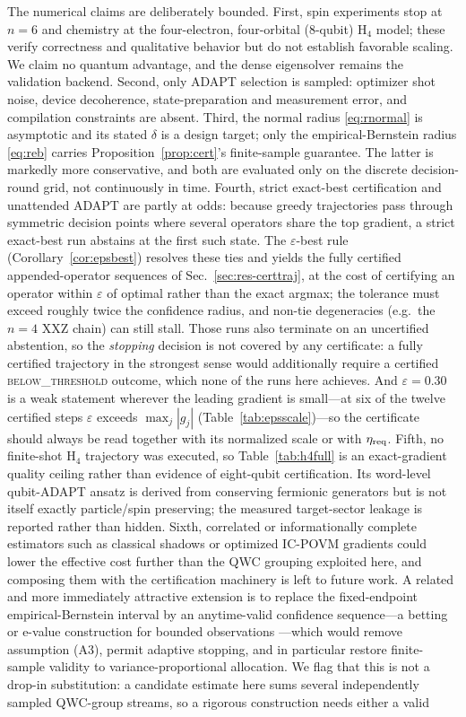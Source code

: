 \documentclass[aps,pra,reprint,superscriptaddress,nofootinbib,floatfix]{revtex4-2}
\begin{document}
The numerical claims are deliberately bounded. First, spin experiments stop at $n=6$ and chemistry at the four-electron, four-orbital ($8$-qubit) H$_4$ model; these verify correctness and qualitative behavior but do not establish favorable scaling. We claim no quantum advantage, and the dense eigensolver remains the validation backend. Second, only ADAPT selection is sampled: optimizer shot noise, device decoherence, state-preparation and measurement error, and compilation constraints are absent. Third, the normal radius \eqref{eq:rnormal} is asymptotic and its stated $\delta$ is a design target; only the empirical-Bernstein radius \eqref{eq:reb} carries Proposition~\ref{prop:cert}'s finite-sample guarantee. The latter is markedly more conservative, and both are evaluated only on the discrete decision-round grid, not continuously in time. Fourth, strict exact-best certification and unattended ADAPT are partly at odds: because greedy trajectories pass through symmetric decision points where several operators share the top gradient, a strict exact-best run abstains at the first such state. The $\varepsilon$-best rule (Corollary~\ref{cor:epsbest}) resolves these ties and yields the fully certified appended-operator sequences of Sec.~\ref{sec:res-certtraj}, at the cost of certifying an operator within $\varepsilon$ of optimal rather than the exact argmax; the tolerance must exceed roughly twice the confidence radius, and non-tie degeneracies (e.g.\ the $n=4$ XXZ chain) can still stall. Those runs also terminate on an uncertified abstention, so the \emph{stopping} decision is not covered by any certificate: a fully certified trajectory in the strongest sense would additionally require a certified \textsc{below\_threshold} outcome, which none of the runs here achieves. And $\varepsilon=0.30$ is a weak statement wherever the leading gradient is small---at six of the twelve certified steps $\varepsilon$ exceeds $\max_j|g_j|$ (Table~\ref{tab:epsscale})---so the certificate should always be read together with its normalized scale or with $\eta_{\rm req}$. Fifth, no finite-shot H$_4$ trajectory was executed, so Table~\ref{tab:h4full} is an exact-gradient quality ceiling rather than evidence of eight-qubit certification. Its word-level qubit-ADAPT ansatz is derived from conserving fermionic generators but is not itself exactly particle/spin preserving; the measured target-sector leakage is reported rather than hidden. Sixth, correlated or informationally complete estimators such as classical shadows \cite{huang2020shadows} or optimized IC-POVM gradients \cite{nykanen2025ic} could lower the effective cost further than the QWC grouping exploited here, and composing them with the certification machinery is left to future work. A related and more immediately attractive extension is to replace the fixed-endpoint empirical-Bernstein interval by an anytime-valid confidence sequence---a betting or e-value construction for bounded observations \cite{howard2021timeuniform}---which would remove assumption (A3), permit adaptive stopping, and in particular restore finite-sample validity to variance-proportional allocation. We flag that this is not a drop-in substitution: a candidate estimate here sums several independently sampled QWC-group streams, so a rigorous construction needs either a valid 
\end{document}
